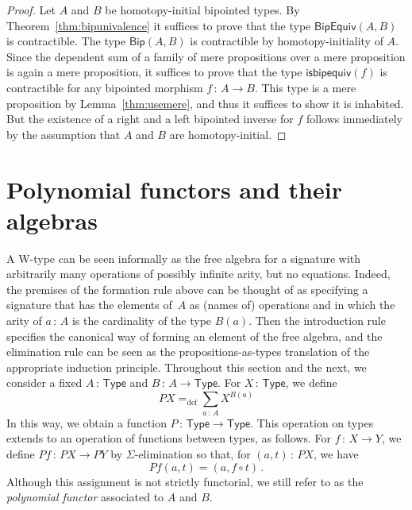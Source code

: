 \documentclass[10pt,a4paper,oneside,reqno]{amsart}
\theoremstyle{mythm}
\theoremstyle{mydef}
\theoremstyle{myrmk}
\newcommand{\defeq}{=_{\mathrm{def}}}
\newcommand{\co}{\,{:}\,}
\newcommand{\U}{\mathsf{Type}}
\newcommand{\BipHom}{\mathsf{Bip}}
\newcommand{\isbipequiv}{\mathsf{isbipequiv}}
\newcommand{\BipEquiv}{\mathsf{BipEquiv}}
\begin{document}
\begin{proof} Let $A$ and $B$ be homotopy-initial bipointed types. 
By Theorem~\ref{thm:bipunivalence} it suffices to prove that the type $\BipEquiv(A,B)$ is contractible. The type 
$\BipHom( A, B)$ is contractible by homotopy-initiality of $A$. Since the dependent sum of a family of mere propositions over a mere proposition is again a mere proposition, it suffices to prove that the type $\isbipequiv(f)$ is contractible for any bipointed morphism $f \co A \to B$. This type is a mere proposition by Lemma~\ref{thm:usemere}, and thus it suffices to show it is inhabited. But the existence of a right and a left bipointed inverse for $f$ follows immediately
by the assumption that $A$ and $B$ are homotopy-initial.
\end{proof}


\newpage

\section{Polynomial functors and their algebras}
\label{section:wfiles}


A W-type can be seen informally as the free algebra for a signature
with arbitrarily many operations of possibly infinite arity, but no equations. Indeed, the premises of the formation rule above can be thought of as specifying a signature that has the elements of~$A$ as (names of) operations and in which the arity of $a \co A$ is the cardinality of the type $B(a)$. Then the introduction rule specifies the canonical way of forming an element of the free algebra, and the elimination rule can be seen as the propositions-as-types translation of the appropriate induction principle. Throughout this section and the next, we consider a fixed  $A \co \U$ and $B \co A \to \U$. For $X \co \U$,
we define
\[
PX \defeq \sum_{a \co A} X^{B(a)}
\]
In this way, we obtain a function $P \co \U \to \U$. This operation on types extends to an operation of functions between 
 types, as follows. For $f \co X\to Y$, we define $P f  \co PX\to PY$ by $\Sigma$-elimination
so that, for $(a, t) \co PX$, we have 
\[
Pf (a, t) = (a,f\circ t) \, .
\] 
Although this assignment is not strictly functorial, we still refer to  as the \emph{polynomial functor} associated to $A$ and $B$. 
\end{document}

